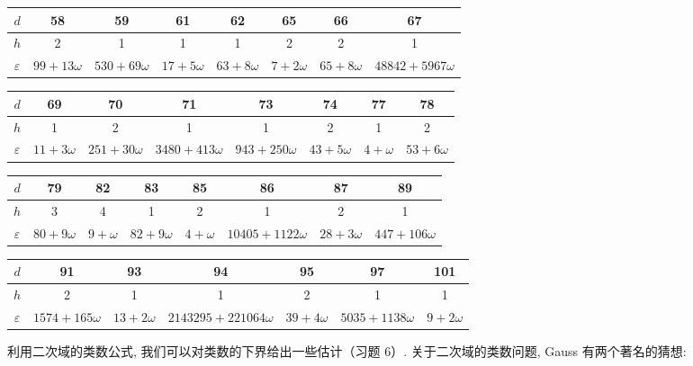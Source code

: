 \begin{center}
\begin{tabular}{|c|ccccccc|}
\hline
$d$ & 58 & 59 & 61 & 62 & 65 & 66 & 67 \\
\hline
$h$ & 2 & 1 & 1 & 1 & 2 & 2 & 1 \\
\hline
$\varepsilon$ & $99+13\omega$ & $530+69\omega$ & $17+5\omega$ & $63+8\omega$ & $7+2\omega$ & $65+8\omega$ & $48842+5967\omega$ \\
\hline
\end{tabular}
\end{center}

\begin{center}
\begin{tabular}{|c|ccccccc|}
\hline
$d$ & 69 & 70 & 71 & 73 & 74 & 77 & 78 \\
\hline
$h$ & 1 & 2 & 1 & 1 & 2 & 1 & 2 \\
\hline
$\varepsilon$ & $11+3\omega$ & $251+30\omega$ & $3480+413\omega$ & $943+250\omega$ & $43+5\omega$ & $4+\omega$ & $53+6\omega$ \\
\hline
\end{tabular}
\end{center}

\begin{center}
\begin{tabular}{|c|ccccccc|}
\hline
$d$ & 79 & 82 & 83 & 85 & 86 & 87 & 89 \\
\hline
$h$ & 3 & 4 & 1 & 2 & 1 & 2 & 1 \\
\hline
$\varepsilon$ & $80+9\omega$ & $9+\omega$ & $82+9\omega$ & $4+\omega$ & $10405+1122\omega$ & $28+3\omega$ & $447+106\omega$ \\
\hline
\end{tabular}
\end{center}

\begin{center}
\begin{tabular}{|c|cccccc|}
\hline
$d$ & 91 & 93 & 94 & 95 & 97 & 101 \\
\hline
$h$ & 2 & 1 & 1 & 2 & 1 & 1 \\
\hline
$\varepsilon$ & $1574+165\omega$ & $13+2\omega$ & $2143295+221064\omega$ & $39+4\omega$ & $5035+1138\omega$ & $9+2\omega$ \\
\hline
\end{tabular}
\end{center}

利用二次域的类数公式, 我们可以对类数的下界给出一些估计（习题 6）. 关于二次域的类数问题, Gauss 有两个著名的猜想:

